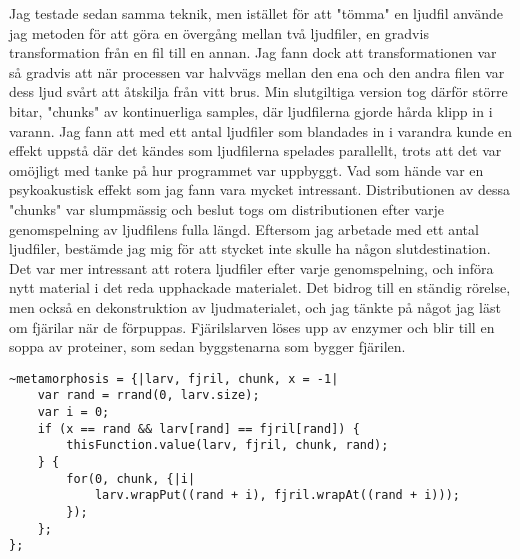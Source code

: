 \documentclass{article}
\begin{document}
  Jag testade sedan samma teknik, men istället för att "tömma" en ljudfil använde jag metoden för att göra en
  övergång mellan två ljudfiler, en gradvis transformation från en fil till en annan. Jag fann dock att
  transformationen var så gradvis att när processen var halvvägs mellan den ena och den andra filen var dess
  ljud svårt att åtskilja från vitt brus. Min slutgiltiga version tog därför större bitar, "chunks" av
  kontinuerliga samples, där ljudfilerna gjorde hårda klipp in i varann. Jag fann att med ett antal ljudfiler
  som blandades in i varandra kunde en effekt uppstå där det kändes som ljudfilerna spelades parallellt, trots
  att det var omöjligt med tanke på hur programmet var uppbyggt. Vad som hände var en psykoakustisk effekt som
  jag fann vara mycket intressant. Distributionen av dessa "chunks" var slumpmässig och beslut togs om
  distributionen efter varje genomspelning av ljudfilens fulla längd. Eftersom jag arbetade med ett antal
  ljudfiler, bestämde jag mig för att stycket inte skulle ha någon slutdestination. Det var mer intressant att
  rotera ljudfiler efter varje genomspelning, och införa nytt material i det reda upphackade materialet. Det
  bidrog till en ständig rörelse, men också en dekonstruktion av ljudmaterialet, och jag tänkte på något jag
  läst om fjärilar när de förpuppas. Fjärilslarven löses upp av enzymer och blir till en soppa av proteiner,
  som sedan byggstenarna som bygger fjärilen.

\begin{lstlisting}[style=SuperCollider-IDE, caption=Funktion för "metamorfos"]
~metamorphosis = {|larv, fjril, chunk, x = -1|
	var rand = rrand(0, larv.size);
	var i = 0;
	if (x == rand && larv[rand] == fjril[rand]) {
		thisFunction.value(larv, fjril, chunk, rand);
	} {
		for(0, chunk, {|i|
			larv.wrapPut((rand + i), fjril.wrapAt((rand + i)));
		});
	};
};
\end{lstlisting}


  
\end{document}
